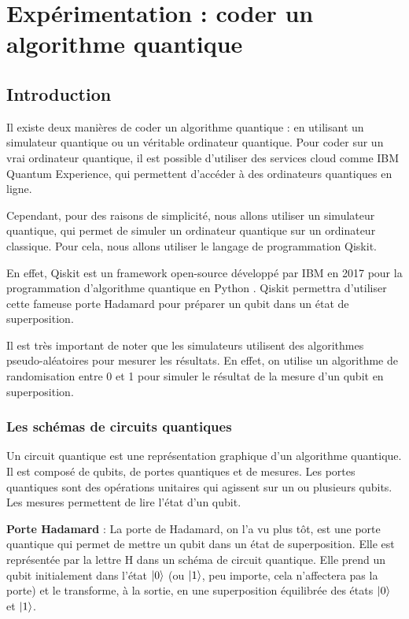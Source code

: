 \documentclass{article}
\begin{document}
\break\section{Expérimentation : coder un algorithme quantique}

\subsection{Introduction}

Il existe deux manières de coder un algorithme quantique : en utilisant un simulateur quantique
ou un véritable ordinateur quantique. Pour coder sur un vrai ordinateur quantique, il est possible
d'utiliser des services cloud comme IBM Quantum Experience, qui permettent d'accéder à des
ordinateurs quantiques en ligne. \cite{wikipediaQuantumPlatform}

Cependant, pour des raisons de simplicité, nous allons utiliser un simulateur quantique, qui
permet de simuler un ordinateur quantique sur un ordinateur classique. Pour cela, nous allons
utiliser le langage de programmation Qiskit.

En effet, Qiskit est un framework open-source développé par IBM en 2017 pour la programmation
d'algorithme quantique en Python \cite{wikipediaQiskitWikipedia}. Qiskit permettra d'utiliser cette fameuse 
porte Hadamard pour préparer un qubit dans un état de superposition.

Il est très important de noter que les simulateurs utilisent des algorithmes pseudo-aléatoires pour
mesurer les résultats. En effet, on utilise un algorithme de randomisation entre 0 et 1 pour simuler
le résultat de la mesure d'un qubit en superposition. 

\subsubsection{Les schémas de circuits quantiques}

Un circuit quantique est une représentation graphique d'un algorithme quantique. Il est composé
de qubits, de portes quantiques et de mesures. Les portes quantiques sont des opérations
unitaires qui agissent sur un ou plusieurs qubits. Les mesures permettent de lire l'état d'un qubit.

\textbf{Porte Hadamard} :
La porte de Hadamard, on l'a vu plus tôt, est une porte quantique qui permet de mettre un qubit
dans un état de superposition. Elle est représentée par la lettre H dans un schéma de circuit
quantique. Elle prend un qubit initialement dans l'état $\ket{0}$ (ou $\ket{1}$, peu importe, cela n'affectera pas la porte) et le transforme, à la sortie, en une superposition
équilibrée des états $\ket{0}$ et $\ket{1}$.
\end{document}
